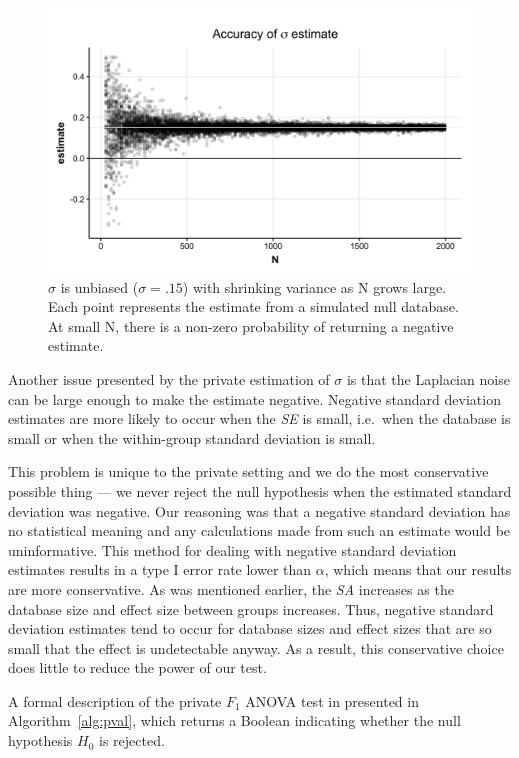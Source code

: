 \documentclass[USenglish,oneside]{article}
\newcounter{ag}
\newcounter{ab}
\newcounter{ar}
\newcommand{\se}{\textit{SE}\xspace}
\newcommand{\sa}{\textit{SA}\xspace}
\begin{document}
\begin{figure}
\centering
\includegraphics[width=.7\linewidth]{images/sigma-estimate.png}
\caption{$\hat{\sigma}$ is unbiased ($\sigma = .15$) with shrinking variance as N grows large. Each point represents the estimate from a simulated null database. At small N, there is a non-zero probability of returning a negative estimate.\label{fig:sigma-estimate}}
\end{figure}

Another issue presented by the private estimation of $\sigma$ is that the Laplacian noise can be large enough to make the estimate negative. Negative standard deviation estimates are more likely to occur when the \se is small, i.e.~when the database is small or when the within-group standard deviation is small.

This problem is unique to the private setting and we do the most conservative possible thing --- we never reject the null hypothesis when the estimated standard deviation was negative. Our reasoning was that a negative standard deviation has no statistical meaning and any calculations made from such an estimate would be uninformative.  This method for dealing with negative standard deviation estimates results in a type I error rate lower than $\alpha$, which means that our results are more conservative. As was mentioned earlier, the \sa increases as the database size and effect size between groups increases. Thus, negative standard deviation estimates tend to occur for database sizes and effect sizes that are so small that the effect is undetectable anyway.  As a result, this conservative choice does little to reduce the power of our test.

A formal description of the private $F_1$ ANOVA test in presented in Algorithm~\ref{alg:pval}, which returns a Boolean indicating whether the null hypothesis $H_0$ is rejected. 
\end{document}
